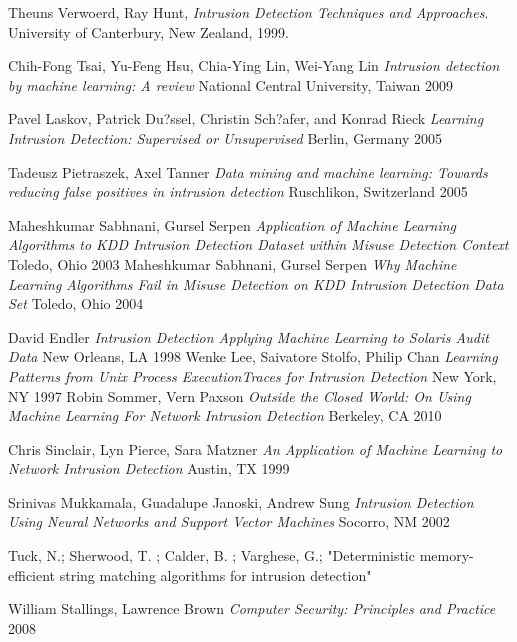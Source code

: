 \documentclass[12pt]{article} %
\begin{document}
\begin{thebibliography}{1}

  Theuns Verwoerd, Ray Hunt,
  \emph{Intrusion Detection Techniques and Approaches}.
  University of Canterbury, New Zealand,
  1999.

  Chih-Fong Tsai, Yu-Feng Hsu, Chia-Ying Lin, Wei-Yang Lin
  \emph{Intrusion detection by machine learning: A review}
  National Central University, Taiwan
  2009
  
  Pavel Laskov, Patrick Du?ssel, Christin Sch?afer, and Konrad Rieck
  \emph{Learning Intrusion Detection: Supervised or Unsupervised}
  Berlin, Germany
  2005
  
  Tadeusz Pietraszek, Axel Tanner
  \emph{Data mining and machine learning: Towards reducing false positives in intrusion detection}
  Ruschlikon, Switzerland
  2005
  
    Maheshkumar Sabhnani, Gursel Serpen
    \emph{Application of Machine Learning Algorithms to
KDD Intrusion Detection Dataset within Misuse Detection Context}
    Toledo, Ohio
    2003
  Maheshkumar Sabhnani, Gursel Serpen
  \emph{Why Machine Learning Algorithms Fail in Misuse Detection
on KDD Intrusion Detection Data Set}
  Toledo, Ohio
   2004
   
  David Endler
  \emph{Intrusion Detection
Applying Machine Learning to Solaris Audit Data}
  New Orleans, LA
  1998
  Wenke Lee, Saivatore Stolfo, Philip Chan
  \emph{Learning Patterns from Unix Process ExecutionTraces for Intrusion Detection}
  New York, NY
  1997
  Robin Sommer, Vern Paxson
  \emph{Outside the Closed World:
On Using Machine Learning For Network Intrusion Detection}
  Berkeley, CA
  2010
  
  Chris Sinclair, Lyn Pierce, Sara Matzner
  \emph{An Application of Machine Learning to Network Intrusion Detection}
  Austin, TX
  1999
  
  Srinivas Mukkamala, Guadalupe Janoski, Andrew Sung
  \emph{Intrusion Detection Using Neural Networks and Support Vector Machines}
  Socorro, NM
  2002
  
 Tuck, N.; Sherwood, T. ; Calder, B. ; Varghese, G.;
"Deterministic memory-efficient string matching algorithms for intrusion detection"

  William Stallings, Lawrence Brown
  \emph{Computer Security: Principles and Practice}
  2008

\end{thebibliography}
\end{document}
